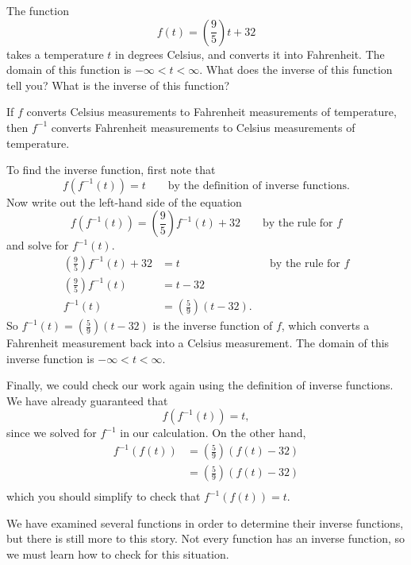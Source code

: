 \documentclass{ximera}
\begin{document}
\begin{example}
  The function
  \[
  f(t) = \left(\frac{9}{5}\right) t + 32
  \]	
  takes a temperature $t$ in degrees Celsius, and converts it into Fahrenheit.  
  The domain of this function is $-\infty < t < \infty$.  What does the inverse 
  of this function tell you? What is the inverse of this function?

  \begin{explanation}
    If $f$ converts Celsius measurements to Fahrenheit measurements of
    temperature, then $f^{-1}$ converts Fahrenheit measurements to
    Celsius measurements of temperature.
    
    To find the inverse function, first note that 
    \[
    f(f^{-1}(t)) = t \qquad \text{by the definition of inverse
      functions.}
    \]
    Now write out the left-hand side of the equation
    \[
    f(f^{-1}(t)) = \left(\frac{9}{5}\right) f^{-1}(t)+32\qquad\text{by the rule for $f$}
    \]
    and solve for $f^{-1}(t)$.
    \begin{align*}
      \left(\frac{9}{5}\right) f^{-1}(t)+32 &= t &&\text{by the rule for $f$}\\
      \left(\frac{9}{5}\right) f^{-1}(t)&= t -32\\
      f^{-1}(t) &= \left(\frac{5}{9}\right)(t - 32).
    \end{align*}
    So $f^{-1}(t) = \left(\frac{5}{9}\right)(t - 32)$ is the inverse
    function of $f$, which converts a Fahrenheit measurement back into
    a Celsius measurement.  The domain of this inverse function is $-\infty < t <\infty$.
    
    Finally, we could check our work again using the definition of inverse functions.
     We have already guaranteed that
    \[
    f(f^{-1}(t)) = t,
    \]
    since we solved for $f^{-1}$ in our calculation.  On the other hand, 
    \begin{align*}
    f^{-1}(f(t)) &=\left(\frac{5}{9}\right)(f(t) - 32)\\
    &= \left(\frac{5}{9}\right)(f(t) - 32)\\
    \end{align*}
    which you should simplify to check that $f^{-1}(f(t)) = t$.
  \end{explanation}
\end{example}



We have examined several functions in order to determine their inverse
functions, but there is still more to this story.  Not every function
has an inverse function, so we must learn how to check for this
situation.
\end{document}
